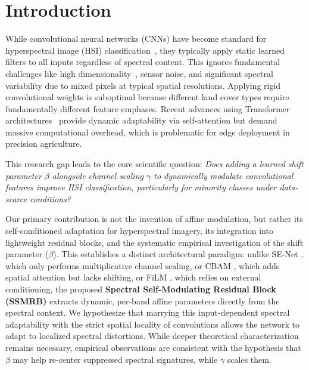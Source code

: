 \documentclass[pdflatex,sn-mathphys-num]{sn-jnl}
\theoremstyle{thmstyleone}
\theoremstyle{thmstyletwo}
\theoremstyle{thmstylethree}
\begin{document}

\maketitle
\section{Introduction}
While convolutional neural networks (CNNs) have become standard for hyperspectral image (HSI) classification~\cite{melgani2004classification,hu2015deep,makantasis2015deep}, they typically apply static learned filters to all inputs regardless of spectral content. This ignores fundamental challenges like high dimensionality~\cite{hughes1968mean}, sensor noise, and significant spectral variability due to mixed pixels at typical spatial resolutions. Applying rigid convolutional weights is suboptimal because different land cover types require fundamentally different feature emphases. Recent advances using Transformer architectures~\cite{hong2022spectralformer,sun2022ssftt,li2023hyformer,sun2025advances} provide dynamic adaptability via self-attention but demand massive computational overhead, which is problematic for edge deployment in precision agriculture.

This research gap leads to the core scientific question: \textit{Does adding a learned shift parameter $\beta$ alongside channel scaling $\gamma$ to dynamically modulate convolutional features improve HSI classification, particularly for minority classes under data-scarce conditions?} 

Our primary contribution is not the invention of affine modulation, but rather its self-conditioned adaptation for hyperspectral imagery, its integration into lightweight residual blocks, and the systematic empirical investigation of the shift parameter ($\beta$). This establishes a distinct architectural paradigm: unlike SE-Net \cite{hu2018squeeze}, which only performs multiplicative channel scaling, or CBAM \cite{woo2018cbam}, which adds spatial attention but lacks shifting, or FiLM \cite{perez2018film}, which relies on external conditioning, the proposed \textbf{Spectral Self-Modulating Residual Block (SSMRB)} extracts dynamic, per-band affine parameters directly from the spectral context. We hypothesize that marrying this input-dependent spectral adaptability with the strict spatial locality of convolutions allows the network to adapt to localized spectral distortions. While deeper theoretical characterization remains necessary, empirical observations are consistent with the hypothesis that $\beta$ may help re-center suppressed spectral signatures, while $\gamma$ scales them. 
\end{document}
